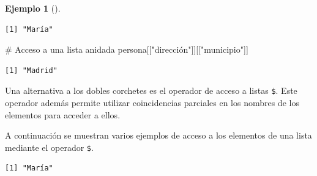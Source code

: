 \documentclass[
  a4paper,
]{scrreport}
\newenvironment{Shaded}{\begin{snugshade}}{\end{snugshade}}
\newcommand{\CommentTok}[1]{\textcolor[rgb]{0.37,0.37,0.37}{#1}}
\newcommand{\DecValTok}[1]{\textcolor[rgb]{0.68,0.00,0.00}{#1}}
\newcommand{\FunctionTok}[1]{\textcolor[rgb]{0.28,0.35,0.67}{#1}}
\newcommand{\NormalTok}[1]{\textcolor[rgb]{0.00,0.23,0.31}{#1}}
\newcommand{\OtherTok}[1]{\textcolor[rgb]{0.00,0.23,0.31}{#1}}
\newcommand{\SpecialCharTok}[1]{\textcolor[rgb]{0.37,0.37,0.37}{#1}}
\newcommand{\StringTok}[1]{\textcolor[rgb]{0.13,0.47,0.30}{#1}}
\theoremstyle{definition}
\theoremstyle{definition}
\newtheorem{example}{Ejemplo}[chapter]
\theoremstyle{remark}
\begin{document}
\begin{example}[]
\begin{verbatim}
[1] "María"
\end{verbatim}

\begin{Shaded}
\begin{Highlighting}[]
\CommentTok{\# Acceso a una lista anidada}
\NormalTok{persona[[}\StringTok{"dirección"}\NormalTok{]][[}\StringTok{"municipio"}\NormalTok{]]}
\end{Highlighting}
\end{Shaded}

\begin{verbatim}
[1] "Madrid"
\end{verbatim}

\end{example}

Una alternativa a los dobles corchetes es el operador de acceso a listas
\texttt{\$}. Este operador además permite utilizar coincidencias
parciales en los nombres de los elementos para acceder a ellos.

A continuación se muestran varios ejemplos de acceso a los elementos de
una lista mediante el operador \texttt{\$}.

\begin{Shaded}
\end{Shaded}

\begin{verbatim}
[1] "María"
\end{verbatim}

\begin{Shaded}
\end{Shaded}
\end{document}
